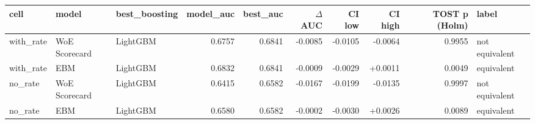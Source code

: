 \begin{tabular}{lllrrrrrrl}
\toprule
cell & model & best\_boosting & model\_auc & best\_auc & $\Delta$ AUC & CI low & CI high & TOST p (Holm) & label \\
\midrule
with\_rate & WoE Scorecard & LightGBM & 0.6757 & 0.6841 & -0.0085 & -0.0105 & -0.0064 & 0.9955 & not equivalent \\
with\_rate & EBM & LightGBM & 0.6832 & 0.6841 & -0.0009 & -0.0029 & +0.0011 & 0.0049 & equivalent \\
no\_rate & WoE Scorecard & LightGBM & 0.6415 & 0.6582 & -0.0167 & -0.0199 & -0.0135 & 0.9997 & not equivalent \\
no\_rate & EBM & LightGBM & 0.6580 & 0.6582 & -0.0002 & -0.0030 & +0.0026 & 0.0089 & equivalent \\
\bottomrule
\end{tabular}
